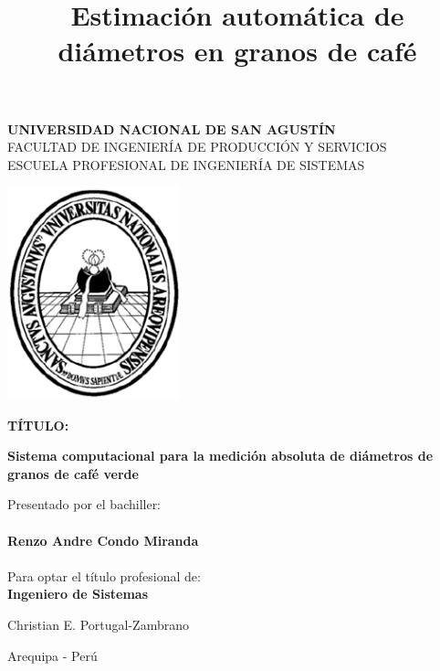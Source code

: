 \documentclass[12pt,a4paper,oneside]{book}
\begin{document}
\begin{titlepage}
 
\begin{center}
 
{\LARGE \bf UNIVERSIDAD NACIONAL DE SAN AGUSTÍN}\\
\vspace{0.5cm}
{\Large FACULTAD DE INGENIERÍA DE PRODUCCIÓN Y SERVICIOS}\\
{\normalsize ESCUELA PROFESIONAL DE INGENIERÍA DE SISTEMAS}\\
[1.0cm]

\begin{center}
\includegraphics[width=5cm]{logounsa}
\end{center}

\vspace{1cm}
{\bf \large TÍTULO: }\\
\title{Estimación automática de diámetros en granos de café} %
{\bf \large Sistema computacional para la medición absoluta de diámetros de granos de café verde}\\
[0.5cm] %
\vspace{1cm}
\begin{center}
Presentado por el bachiller:\\~\\
\textbf{\large{Renzo Andre Condo Miranda}}\\~\\
Para optar el título profesional de:\\
\textbf{\large{Ingeniero de Sistemas}}\\
\end{center}
 
 \vspace{1cm}
 
 \hspace{12cm}{\bf ASESOR:}
\begin{flushright}
{Christian E. Portugal-Zambrano}\\
\end{flushright}
\vspace{2cm}
{\large Arequipa - Perú}\\[0.2cm] %
\end{center}

\end{titlepage}
\end{document}
